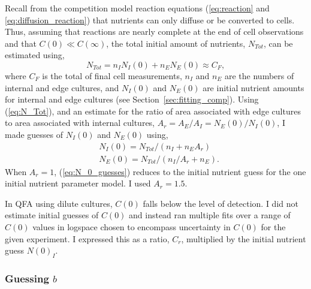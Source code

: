 Recall from the competition model reaction equations
(\ref{eq:reaction} and \ref{eq:diffusion_reaction}) that nutrients can
only diffuse or be converted to cells. Thus, assuming that reactions
are nearly complete at the end of cell observations and that
\(C(0) \ll C(\infty)\), the total initial amount of nutrients,
\(N_{Tot}\), can be estimated using,
\begin{equation}
  \label{eq:N_Tot}
  N_{Tot} = n_{I}N_{I}(0) + n_{E}N_{E}(0) \approx C_{F},
\end{equation}
where \(C_{F}\) is the total of final cell measurements, \(n_{I}\) and
\(n_{E}\) are the numbers of internal and edge cultures, and
\(N_{I}(0)\) and \(N_{E}(0)\) are initial nutrient amounts
for internal and edge cultures (see
Section~\ref{sec:fitting_comp}). Using (\ref{eq:N_Tot}), and an estimate
for the ratio of area associated with edge cultures to area associated
with internal cultures,
\(A_{r} = A_{E} / A_{I} = N_{E}(0) / N_{I}(0)\), I made
guesses of \(N_{I}(0)\) and \(N_{E}(0)\) using,
%
\begin{equation}
  \label{eq:N_0_guesses}
  \begin{aligned}
    &N_{I}(0) = N_{Tot} / (n_{I} + n_{E}A_{r})\\
    &N_{E}(0) = N_{Tot} / (n_{I}/A_{r} + n_{E}).
  \end{aligned}
\end{equation}
%
When \(A_{r} = 1\), (\ref{eq:N_0_guesses}) reduces to the initial
nutrient guess for the one initial nutrient parameter model. I used
\(A_{r} = 1.5\).

In QFA using dilute cultures, \(C(0)\) falls below the level of
detection. I did not estimate initial guesses of \(C(0)\) and instead
ran multiple fits over a range of \(C(0)\) values in logspace chosen
to encompass uncertainty in \(C(0)\) for the given experiment. I
expressed this as a ratio, \(C_{r}\), multiplied by the initial
nutrient guess \(N(0)_{I}\).



\subsubsection{\boldmath Guessing \(b\) \unboldmath}
\label{sec:guessing_b}


